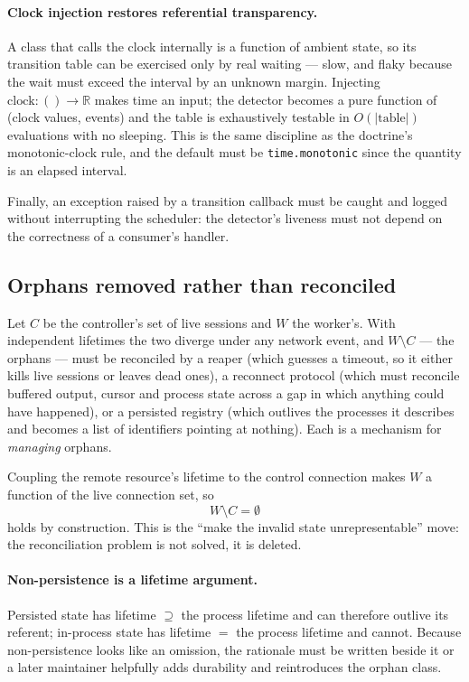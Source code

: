 \documentclass[11pt]{article}
\begin{document}
\paragraph{Clock injection restores referential transparency.} A class that
calls the clock internally is a function of ambient state, so its transition
table can be exercised only by real waiting --- slow, and flaky because the
wait must exceed the interval by an unknown margin. Injecting
$\mathrm{clock} : () \to \mathbb{R}$ makes time an input; the detector becomes
a pure function of (clock values, events) and the table is exhaustively
testable in $O(|\mathrm{table}|)$ evaluations with no sleeping. This is the
same discipline as the doctrine's monotonic-clock rule, and the default must be
\texttt{time.monotonic} since the quantity is an elapsed interval.

Finally, an exception raised by a transition callback must be caught and logged
without interrupting the scheduler: the detector's liveness must not depend on
the correctness of a consumer's handler.

\subsection{Orphans removed rather than reconciled}
\label{lbl:HS-LIVE-02}

Let $C$ be the controller's set of live sessions and $W$ the worker's. With
independent lifetimes the two diverge under any network event, and $W \setminus
C$ --- the orphans --- must be reconciled by a reaper (which guesses a timeout,
so it either kills live sessions or leaves dead ones), a reconnect protocol
(which must reconcile buffered output, cursor and process state across a gap in
which anything could have happened), or a persisted registry (which outlives
the processes it describes and becomes a list of identifiers pointing at
nothing). Each is a mechanism for \emph{managing} orphans.

Coupling the remote resource's lifetime to the control connection makes $W$ a
function of the live connection set, so
\begin{equation}
W \setminus C = \emptyset
\end{equation}
holds by construction. This is the ``make the invalid state unrepresentable''
move: the reconciliation problem is not solved, it is deleted.

\paragraph{Non-persistence is a lifetime argument.} Persisted state has lifetime
$\supseteq$ the process lifetime and can therefore outlive its referent;
in-process state has lifetime $=$ the process lifetime and cannot. Because
non-persistence looks like an omission, the rationale must be written beside it
or a later maintainer helpfully adds durability and reintroduces the orphan
class.
\end{document}
